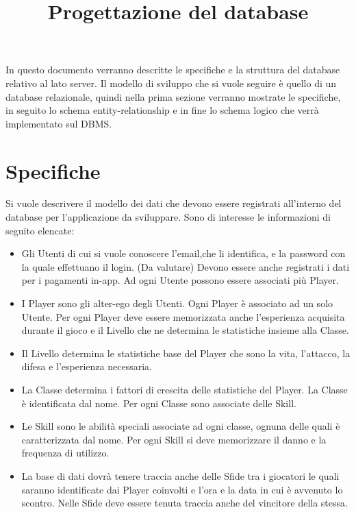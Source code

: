 \documentclass[a4paper,12pt]{article}
\title{Progettazione del database}
\begin{document}
\maketitle

In questo documento verranno descritte le specifiche e la struttura del database relativo al lato server. Il modello di sviluppo che si vuole seguire è quello di un database relazionale, quindi nella prima sezione verranno mostrate le specifiche, in seguito lo schema entity-relationship e in fine lo schema logico che verrà implementato sul DBMS. 

\section*{Specifiche}Si vuole descrivere il modello dei dati che devono essere registrati all'interno del database per l'applicazione da sviluppare. Sono di interesse le informazioni di seguito elencate:
\begin{itemize}
\item Gli Utenti di cui si vuole conoscere l'email,che li identifica, e la password con la quale effettuano il login. (Da valutare) Devono essere anche registrati i dati per i pagamenti in-app. Ad ogni Utente possono essere associati più Player.
\item I Player sono gli alter-ego degli Utenti. Ogni Player è associato ad un solo Utente. Per ogni Player deve essere memorizzata anche l'esperienza acquisita durante il gioco e il Livello che ne determina le statistiche insieme alla Classe.
\item Il Livello determina le statistiche base del Player che sono la vita, l'attacco, la difesa e l'esperienza necessaria.
\item La Classe determina i fattori di crescita delle statistiche del Player. La Classe è identificata dal nome. Per ogni Classe sono associate delle Skill.
\item Le Skill sono le abilità speciali associate ad ogni classe, ognuna delle quali è caratterizzata dal nome. Per ogni Skill si deve memorizzare il danno e la frequenza di utilizzo.
\item La base di dati dovrà tenere traccia anche delle Sfide tra i giocatori le quali saranno identificate dai Player coinvolti e l'ora e la data in cui è avvenuto lo scontro. Nelle Sfide deve essere tenuta traccia anche del vincitore della stessa.
\end{itemize} 
\end{document}
